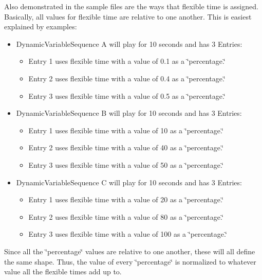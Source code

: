 Also demonstrated in the sample files are the ways that flexible time is assigned. Basically, all values for flexible time are relative to one another. This is easiest explained by examples:

\begin{itemize}
\item Dynamic\-Variable\-Sequence A will play for 10 seconds and has 3 Entries:\begin{itemize}
\item Entry 1 uses flexible time with a value of 0.1 as a \char`\"{}percentage.\char`\"{}\item Entry 2 uses flexible time with a value of 0.4 as a \char`\"{}percentage.\char`\"{}\item Entry 3 uses flexible time with a value of 0.5 as a \char`\"{}percentage.\char`\"{}\end{itemize}
\end{itemize}


\begin{itemize}
\item Dynamic\-Variable\-Sequence B will play for 10 seconds and has 3 Entries:\begin{itemize}
\item Entry 1 uses flexible time with a value of 10 as a \char`\"{}percentage.\char`\"{}\item Entry 2 uses flexible time with a value of 40 as a \char`\"{}percentage.\char`\"{}\item Entry 3 uses flexible time with a value of 50 as a \char`\"{}percentage.\char`\"{}\end{itemize}
\end{itemize}


\begin{itemize}
\item Dynamic\-Variable\-Sequence C will play for 10 seconds and has 3 Entries:\begin{itemize}
\item Entry 1 uses flexible time with a value of 20 as a \char`\"{}percentage.\char`\"{}\item Entry 2 uses flexible time with a value of 80 as a \char`\"{}percentage.\char`\"{}\item Entry 3 uses flexible time with a value of 100 as a \char`\"{}percentage.\char`\"{}\end{itemize}
\end{itemize}


Since all the \char`\"{}percentage\char`\"{} values are relative to one another, these will all define the same shape. Thus, the value of every \char`\"{}percentage\char`\"{} is normalized to whatever value all the flexible times add up to.

